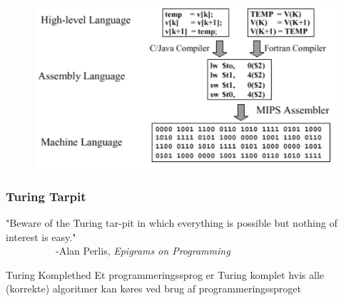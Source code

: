 \documentclass[12pt,t]{beamer}
\begin{document}
\begin{frame}
\begin{figure}[h]
\centering
\includegraphics[scale=0.55]{./include/LangToMachine.pdf}
\end{figure}
\end{frame}
\begin{frame}
\frametitle{Turing Tarpit}
"Beware of the Turing tar-pit in which everything is possible
 but nothing of interest is easy."\\
~~~~~~~~~~-Alan Perlis, \emph{Epigrams on Programming}\\
\begin{block}{Turing Komplethed}
Et programmeringssprog er Turing komplet hvis alle (korrekte) algoritmer kan
køres ved brug af programmeringssproget
\end{block}
\end{frame}
\end{document}
